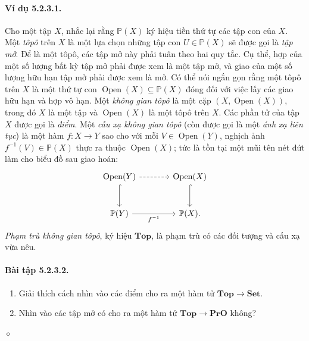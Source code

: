 \paragraph{Ví dụ 5.2.3.1.} Cho một tập $X$, nhắc lại rằng $\mathbb P(X)$ ký hiệu tiền thứ tự các tập con của $X$. Một \emph{tôpô} trên $X$ là một lựa chọn những tập con $U\in\mathbb P(X)$ sẽ được gọi là \emph{tập mở}. Để là một tôpô, các tập mở này phải tuân theo hai quy tắc. Cụ thể, hợp của một số lượng bất kỳ tập mở phải được xem là một tập mở, và giao của một số lượng hữu hạn tập mở phải được xem là mở. Có thể nói ngắn gọn rằng một tôpô trên $X$ là một thứ tự con $\operatorname{Open}(X)\subseteq\mathbb P(X)$ đóng đối với việc lấy các giao hữu hạn và hợp vô hạn.
Một \emph{không gian tôpô} là một cặp $(X,\operatorname{Open}(X))$, trong đó $X$ là một tập và $\operatorname{Open}(X)$ là một tôpô trên $X$. Các phần tử của tập $X$ được gọi là \emph{điểm}. Một \emph{cấu xạ không gian tôpô} (còn được gọi là một \emph{ánh xạ liên tục}) là một hàm $f:X\to Y$ sao cho với mỗi $V\in\operatorname{Open}(Y)$, nghịch ảnh $f^{-1}(V)\in\mathbb P(X)$ thực ra thuộc $\operatorname{Open}(X)$; tức là tồn tại một mũi tên nét đứt làm cho biểu đồ sau giao hoán:
\[\begin{tikzcd}[column sep=large,row sep=large]
\operatorname{Open}(Y)\arrow[r,dashed]\arrow[d,hook]&\operatorname{Open}(X)\arrow[d,hook]\\
\mathbb P(Y)\arrow[r,"f^{-1}"']&\mathbb P(X).
\end{tikzcd}\]
\emph{Phạm trù không gian tôpô}, ký hiệu $\mathbf{Top}$, là phạm trù có các đối tượng và cấu xạ vừa nêu.
\paragraph{Bài tập 5.2.3.2.}
\begin{enumerate}[label=\alph*.]
\item Giải thích cách nhìn vào các điểm cho ra một hàm tử $\mathbf{Top}\to\mathbf{Set}$.
\item Nhìn vào các tập mở có cho ra một hàm tử $\mathbf{Top}\to\mathbf{PrO}$ không?
\end{enumerate}\hfill$\diamond$
